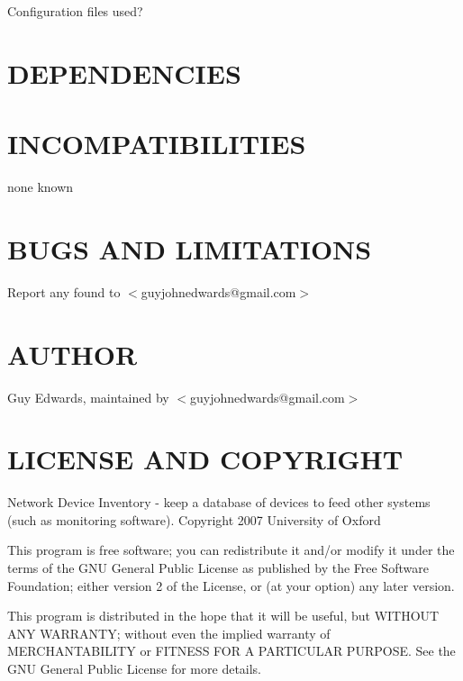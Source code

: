 \documentclass{book}
\begin{document}
Configuration files used?


\section{DEPENDENCIES}
\label{_DEPENDENCIES}
\hypertarget{_DEPENDENCIES}{}


\section{INCOMPATIBILITIES}
\label{_INCOMPATIBILITIES}
\hypertarget{_INCOMPATIBILITIES}{}



none known


\section{BUGS AND LIMITATIONS}
\label{_BUGS_AND_LIMITATIONS}
\hypertarget{_BUGS_AND_LIMITATIONS}{}



Report any found to $<$guyjohnedwards@gmail.com$>$


\section{AUTHOR}
\label{_AUTHOR}
\hypertarget{_AUTHOR}{}



Guy Edwards, maintained by $<$guyjohnedwards@gmail.com$>$


\section{LICENSE AND COPYRIGHT}
\label{_LICENSE_AND_COPYRIGHT}
\hypertarget{_LICENSE_AND_COPYRIGHT}{}



Network Device Inventory - keep a database of devices to feed other systems (such as monitoring software). Copyright 2007 University of Oxford



This program is free software; you can redistribute it and/or modify it under the terms of the GNU General Public License as published by the Free Software Foundation; either version 2 of the License, or (at your option) any later version.



This program is distributed in the hope that it will be useful, but WITHOUT ANY WARRANTY; without even the implied warranty of MERCHANTABILITY or FITNESS FOR A PARTICULAR PURPOSE. See the GNU General Public License for more details.
\end{document}
